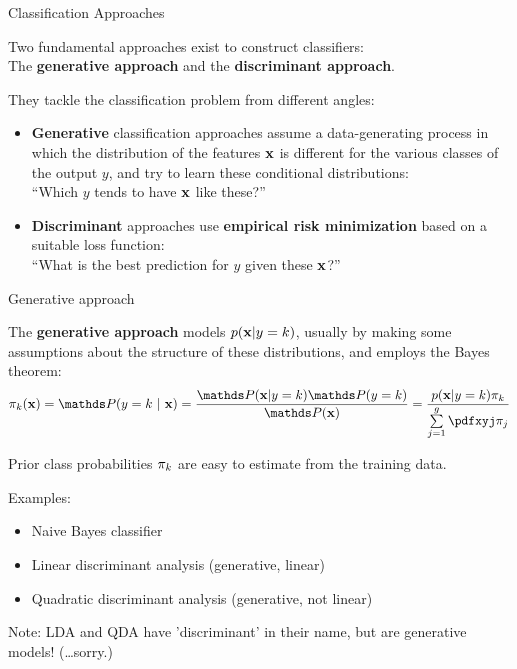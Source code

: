 \documentclass[11pt,compress,t,notes=noshow, xcolor=table]{beamer}
\begin{document}
\begin{vbframe}{Classification Approaches}

  Two fundamental approaches exist to construct classifiers:\\
  The \textbf{generative approach} and the \textbf{discriminant approach}.

\lz
They tackle the classification problem from different angles:

\begin{itemize}
\item \textbf{Generative} classification approaches assume a data-generating process in which the distribution of the features $\mathbf{x}$ is different for the various classes of the output $y$, and try to learn these conditional distributions:\\ \enquote{Which $y$ tends to have $\mathbf{x}$ like these?}
\lz
\item \textbf{Discriminant} approaches use \textbf{empirical risk minimization} based on a suitable loss function:\\ \enquote{What is the best prediction for $y$ given these $\mathbf{x}$?}
\end{itemize}
\end{vbframe}

\begin{vbframe}{Generative approach}

  The \textbf{generative approach}
  models $p(\mathbf{x} | y= k)$, usually by making some assumptions about the structure of these distributions, and employs the Bayes theorem:
  $$\pikx = \postk = \frac{\P(\xv | y = k) \P(y = k)}{\P(\xv)} = \frac{\pdfxyk \pik}{\sumjg \pdfxyj \pi_j}$$


  Prior class probabilities $\pi_{k}$ are easy to estimate from the training data.

  \lz

  Examples:
  \begin{itemize}
  \item Naive Bayes classifier
  \item Linear discriminant analysis (generative, linear)
  \item Quadratic discriminant analysis (generative, not linear)
  \end{itemize}

{\small Note: LDA and QDA have 'discriminant' in their name, but are generative models! (\dots sorry.)}
\end{vbframe}
\end{document}
